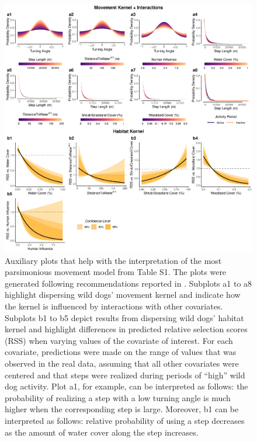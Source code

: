 \documentclass[abstract=off,10pt,a4paper,bibliography=totocnumbered]{article}
\begin{document}
\begin{figure}[hbtp]
 \begin{center}
  \includegraphics[width = \textwidth]{99_MovementModelInterpretation.png}
  \caption{Auxiliary plots that help with the interpretation of the most
  parsimonious movement model from Table S1. The plots were generated following
  recommendations reported in \cite{Fieberg.2021}. Subplots a1 to a8 highlight
  dispersing wild dogs' movement kernel and indicate how the kernel is
  influenced by interactions with other covariates. Subplots b1 to b5 depict
  results from dispersing wild dogs' habitat kernel and highlight differences in
  predicted relative selection scores (RSS) when varying values of the covariate
  of interest. For each covariate, predictions were made on the range of values
  that was observed in the real data, assuming that all other covariates were
  centered and that steps were realized during periods of ``high'' wild dog
  activity. Plot a1, for example, can be interpreted as follows: the probability
  of realizing a step with a low turning angle is much higher when the
  corresponding step is large. Moreover, b1 can be interpreted as follows:
  relative probability of using a step decreases as the amount of water cover
  along the step increases.}
  \label{Interpretation}
 \end{center}
\end{figure}
\end{document}
